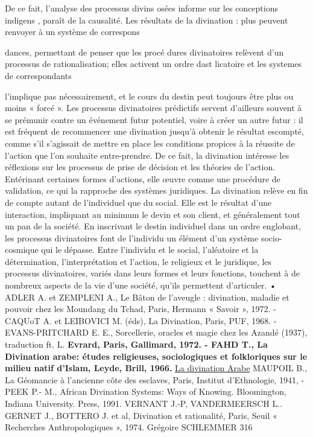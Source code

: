 De ce fait, l'analyse des processus divins osées   informe sur les conceptions indigens
 , paraît
de la causalité. Les résultats de la divination
: plus peuvent renvoyer à un système de correspons
 
dances, permettant de penser que les procé
dures divinatoires relèvent d'un processus de rationalisation; elles activent un ordre dast licatoire et les systemes de correspondants


l'implique pas nécessairement, et le cours du destin peut toujours être plus ou moins « forcé ». Les processus divinatoires prédictifs servent d'ailleurs souvent à se prémunir contre un événement futur potentiel, voire à créer un autre futur : il est fréquent de recommencer une divination jusqu'à obtenir le résultat escompté, comme s'il s'agissait de mettre en place les conditions propices à la réussite de l'action que l'on souhaite entre-prendre. De ce fait, la divination intéresse les réflexions sur les processus de prise de décision et les théories de l'action. Entérinant certaines formes d'actions, elle œuvre comme une procédure de validation, ce qui la rapproche des systèmes juridiques.
La divination relève en fin de compte autant de l'individuel que du social. Elle est le résultat d'une interaction, impliquant au minimum le devin et son client, et généralement tout un pan de la société. En inscrivant le destin individuel dans un ordre englobant, les processus divinatoires font de l'individu un élément d'un système socio-cosmique qui le dépasse. Entre l'individu et le social, l'aléatoire et la détermination, l'interprétation et l'action, le religieux et le juridique, les processus divinatoires, variés dans leurs formes et leurs fonctions, touchent à de nombreux aspects de la vie d'une société, qu'ils permettent d'articuler.
• ADLER A. et ZEMPLENI A., Le Bâton de l'aveugle : divination, maladie et pouvoir chez les Moundang du Tchad, Paris, Hermann « Savoir », 1972. - CAQUoT A.
et LEIBOVICI M. (éds), La Divination, Paris, PUF,
1968. - EVANS-PRITCHARD E. E., Sorcellerie, oracles et magie chez les Azandé (1937), traduction ft. L.
\textbf{Evrard, Paris, Gallimard, 1972. - FAHD T., La Divination arabe: études religieuses, sociologiques et folkloriques sur le milieu natif d'Islam, Leyde, Brill, 1966.} \href{https://books.google.fr/books?id=ETsVAAAAIAAJ&lpg=PP1&hl=fr&pg=PA8#v=onepage&q&f=false}{La divination Arabe}
MAUPOIL B., La Géomancie à l'ancienne côte des esclaves, Paris, Institut d'Ethnologie, 1941, - PEEK P.-
M., African Divination Systems: Ways of Knowing.
Bloomington, Indiana University. Press, 1991.
VERNANT J.-P, VANDERMEERSCH L.. GERNET J., BOTTERO J. et al, Divination et rationalité, Paris, Seuil « Recherches Anthropologiques », 1974.
Grégoire SCHLEMMER
316
 
